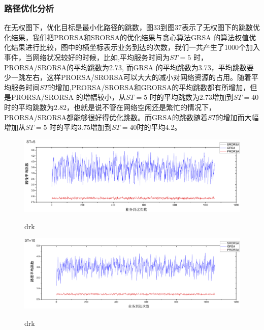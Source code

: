 \subsubsection{路径优化分析}

在无权图下，优化目标是最小化路径的跳数，图33到图37表示了无权图下的跳数优化结果，我们把PRORSA和SRORSA的优化结果与贪心算法GRSA 的算法权值优化结果进行比较，图中的横坐标表示业务到达的次数，我们一共产生了1000个加入事件，当网络状况较好的时候，比如,平均服务时间为$ST=5$ 时，PRORSA/SRORSA的平均跳数为2.73, 而GRSA 的平均跳数为3.73，平均跳数要少一跳左右，这样PRORSA/SRORSA可以大大的减小对网络资源的占用。随着平均服务时间$ST$的增加,PRORSA/SRORSA和GRORSA的平均跳数都有所增加，但是PRORSA/SRORSA 的增幅较小，从$ST=5$ 时的平均跳数为2.73增加到$ST=40$时的平均跳数为2.82，也就是说不管在网络空闲还是繁忙的情况下，PRORSA/SRORSA都能够很好得优化跳数。而GRSA的跳数随着$ST$的增加而大幅增加从$ST=5$ 时的平均3.75增加到$ST=40$时的平均4.2。
\begin{figure}
\setlength{\belowcaptionskip}{-0.5cm}
  \begin{center}
    {\includegraphics[width=1 \textwidth]{figures/B5H.pdf}}
    \end{center}
  \caption{{\footnotesize{drk}}}
  \label{drk}
\end{figure}
\begin{figure}
\setlength{\belowcaptionskip}{-0.5cm}
  \begin{center}
    {\includegraphics[width=1 \textwidth]{figures/B10H.pdf}}
    \end{center}
  \caption{{\footnotesize{drk}}}
  \label{drk}
\end{figure}
